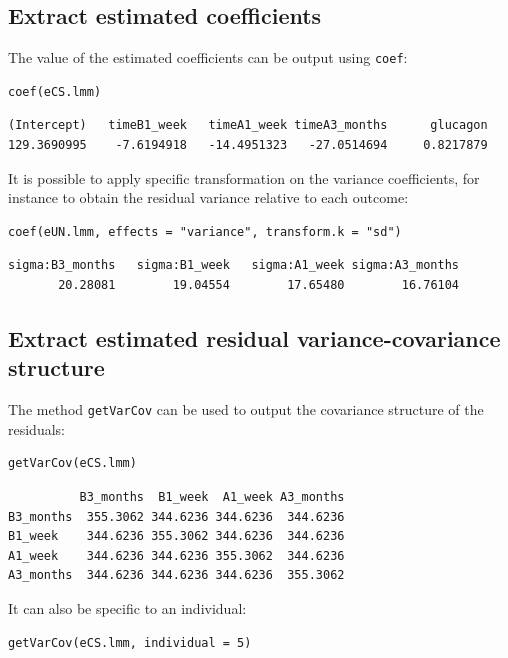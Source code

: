 \documentclass[12pt]{article}
\begin{document}
\subsection{Extract estimated coefficients}
\label{sec:orgc7dcb42}
The value of the estimated coefficients can be output using \texttt{coef}:
\lstset{language=r,label= ,caption= ,captionpos=b,numbers=none}
\begin{lstlisting}
coef(eCS.lmm)
\end{lstlisting}

\begin{verbatim}
(Intercept)   timeB1_week   timeA1_week timeA3_months      glucagon 
129.3690995    -7.6194918   -14.4951323   -27.0514694     0.8217879
\end{verbatim}


It is possible to apply specific transformation on the variance
coefficients, for instance to obtain the residual variance relative to
each outcome:
\lstset{language=r,label= ,caption= ,captionpos=b,numbers=none}
\begin{lstlisting}
coef(eUN.lmm, effects = "variance", transform.k = "sd")
\end{lstlisting}

\begin{verbatim}
sigma:B3_months   sigma:B1_week   sigma:A1_week sigma:A3_months 
       20.28081        19.04554        17.65480        16.76104
\end{verbatim}

\subsection{Extract estimated residual variance-covariance structure}
\label{sec:org7b08a1f}

The method \texttt{getVarCov} can be used to output the covariance structure of the residuals:
\lstset{language=r,label= ,caption= ,captionpos=b,numbers=none}
\begin{lstlisting}
getVarCov(eCS.lmm)
\end{lstlisting}

\begin{verbatim}
          B3_months  B1_week  A1_week A3_months
B3_months  355.3062 344.6236 344.6236  344.6236
B1_week    344.6236 355.3062 344.6236  344.6236
A1_week    344.6236 344.6236 355.3062  344.6236
A3_months  344.6236 344.6236 344.6236  355.3062
\end{verbatim}


It can also be specific to an individual:
\lstset{language=r,label= ,caption= ,captionpos=b,numbers=none}
\begin{lstlisting}
getVarCov(eCS.lmm, individual = 5)
\end{lstlisting}
\end{document}
